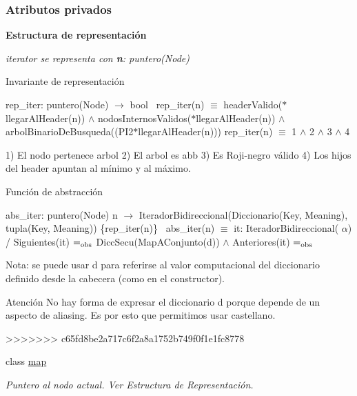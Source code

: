\subsubsection*{Atributos privados}
\begin{Indent}\textbf{ Estructura de representación}\par
{\em iterator se representa con {\bfseries n}\+: puntero(\+Node)

\begin{DoxyParagraph}{Invariante de representación}

\end{DoxyParagraph}
rep\+\_\+iter\+: puntero(\+Node) $\to$ bool~\newline
rep\+\_\+iter(n) $\equiv$ header\+Valido($\ast$llegar\+Al\+Header(n)) $\land$ nodos\+Internos\+Validos($\ast$llegar\+Al\+Header(n)) $\land$ arbol\+Binario\+De\+Busqueda((P\+I2$\ast$llegar\+Al\+Header(n))) rep\+\_\+iter(n) $\equiv$ 1 $\land$ 2 $\land$ 3 $\land$ 4

1) El nodo pertenece arbol 2) El arbol es abb 3) Es Roji-\/negro válido 4) Los hijos del header apuntan al mínimo y al máximo. \begin{DoxyParagraph}{Función de abstracción}

\end{DoxyParagraph}
abs\+\_\+iter\+: puntero(\+Node) n $\to$ Iterador\+Bidireccional(Diccionario(Key, Meaning), tupla(Key, Meaning)) \{rep\+\_\+iter(n)\}~\newline
abs\+\_\+iter(n) $\equiv$ it\+: Iterador\+Bidireccional( $\alpha$) / Siguientes(it) $=_{\rm obs}$ Dicc\+Secu(\+Map\+A\+Conjunto(d)) $\land$ Anteriores(it) $=_{\rm obs}$

Nota\+: se puede usar {\ttfamily d} para referirse al valor computacional del diccionario definido desde la cabecera (como en el constructor).

\begin{DoxyAttention}{Atención}
No hay forma de expresar el diccionario {\ttfamily d} porque depende de un aspecto de aliasing. Es por esto que permitimos usar castellano. 
\end{DoxyAttention}
}\begin{DoxyCompactItemize}
>>>>>>> c65fd8be2a717c6f2a8a1752b749f0f1e1fc8778
\item 
class \hyperlink{classaed2_1_1map_1_1iterator_aeda338414e516b47761f994fb78056c6_aeda338414e516b47761f994fb78056c6}{map}
\begin{DoxyCompactList}\small\item\em \-Puntero al nodo actual. \-Ver \-Estructura de \-Representación. \end{DoxyCompactList}\end{DoxyCompactItemize}



\end{Indent}
